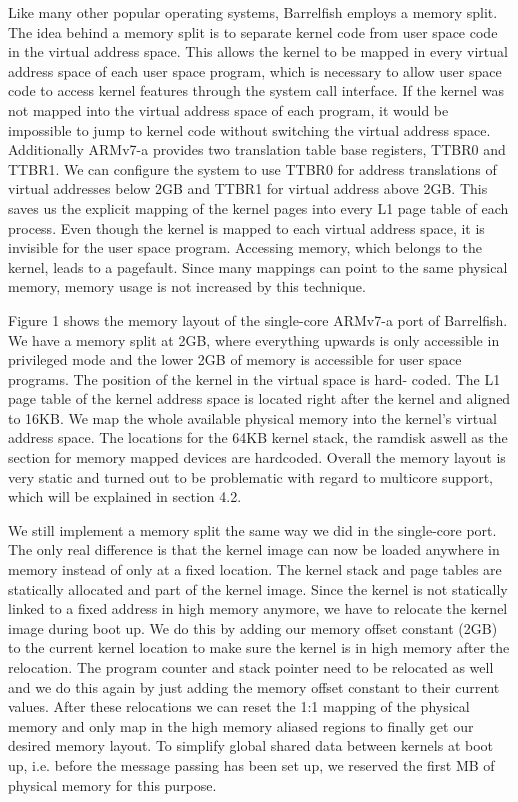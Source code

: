 \documentclass[a4paper,twoside]{report} %
\begin{document}
Like many other popular operating systems, Barrelfish employs a memory
split. The idea behind a memory split is to separate kernel code from
user space code in the virtual address space. This allows the kernel
to be mapped in every virtual address space of each user space
program, which is necessary to allow user space code to access kernel
features through the system call interface. If the kernel was not
mapped into the virtual address space of each program, it would be
impossible to jump to kernel code without switching the virtual
address space. Additionally ARMv7-a provides two translation table
base registers, TTBR0 and TTBR1. We can configure the system to use
TTBR0 for address translations of virtual addresses below 2GB and
TTBR1 for virtual address above 2GB. This saves us the explicit
mapping of the kernel pages into every L1 page table of each process.
Even though the kernel is mapped to each virtual address space, it is
invisible for the user space program. Accessing memory, which belongs
to the kernel, leads to a pagefault. Since many mappings can point to
the same physical memory, memory usage is not increased by this
technique.


Figure 1 shows the memory layout of the single-core ARMv7-a port of
Barrelfish. We have a memory split at 2GB, where everything upwards is
only accessible in privileged mode and the lower 2GB of memory is
accessible for user space programs. The position of the kernel in the
virtual space is hard- coded. The L1 page table of the kernel address
space is located right after the kernel and aligned to 16KB. We map
the whole available physical memory into the kernel’s virtual address
space. The locations for the 64KB kernel stack, the ramdisk aswell as
the section for memory mapped devices are hardcoded.  Overall the
memory layout is very static and turned out to be problematic with
regard to multicore support, which will be explained in section 4.2.


We still implement a memory split the same way we did in the
single-core port. The only real difference is that the kernel image
can now be loaded anywhere in memory instead of only at a fixed
location. The kernel stack and page tables are statically allocated
and part of the kernel image. Since the kernel is not statically
linked to a fixed address in high memory anymore, we have to relocate
the kernel image during boot up. We do this by adding our memory
offset constant (2GB) to the current kernel location to make sure the
kernel is in high memory after the relocation. The program counter and
stack pointer need to be relocated as well and we do this again by
just adding the memory offset constant to their current values. After
these relocations we can reset the 1:1 mapping of the physical memory
and only map in the high memory aliased regions to finally get our
desired memory layout. To simplify global shared data between kernels
at boot up, i.e. before the message passing has been set up, we
reserved the first MB of physical memory for this purpose.
\end{document}
